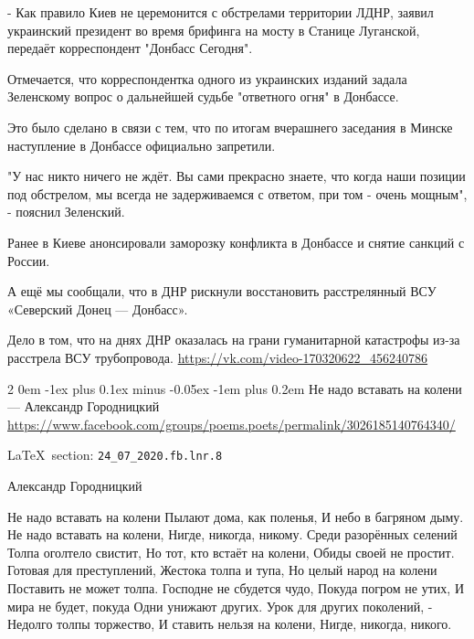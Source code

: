 \documentclass[a4paper,11pt]{extreport}
\makeatletter
\renewcommand\subsection{%
  \clearpage
    \@startsection{subsection}%
    {2}%
    {0em}%
    {-1ex plus 0.1ex minus -0.05ex}%
    {-1em plus 0.2em}%
    {\scshape\bfseries\Large}%
}
\makeatother
\begin{document}

- Как правило Киев не церемонится с обстрелами территории ЛДНР, заявил
украинский президент во время брифинга на мосту в Станице Луганской, передаёт
корреспондент "Донбасс Сегодня".

Отмечается, что корреспондентка одного из украинских изданий задала Зеленскому
вопрос о дальнейшей судьбе "ответного огня" в Донбассе.

Это было сделано в связи с тем, что по итогам вчерашнего заседания в Минске
наступление в Донбассе официально запретили.

"У нас никто ничего не ждёт. Вы сами прекрасно знаете, что когда наши позиции
под обстрелом, мы всегда не задерживаемся с ответом, при том - очень мощным", -
пояснил Зеленский.

Ранее в Киеве анонсировали заморозку конфликта в Донбассе и снятие санкций с
России.

А ещё мы сообщали, что в ДНР рискнули восстановить расстрелянный ВСУ «Северский
Донец --- Донбасс».

Дело в том, что на днях ДНР оказалась на грани гуманитарной катастрофы из-за
расстрела ВСУ трубопровода.  \url{https://vk.com/video-170320622_456240786}
  
 
 
\subsection{Не надо вставать на колени --- Александр Городницкий}
\label{sec:24_07_2020.fb.lnr.8}
\url{https://www.facebook.com/groups/poems.poets/permalink/3026185140764340/}
  
\vspace{0.5cm}
\LaTeX~section: \verb|24_07_2020.fb.lnr.8|
\vspace{0.5cm}

\obeycr
Александр Городницкий

Не надо вставать на колени
Пылают дома, как поленья,
И небо в багряном дыму.
Не надо вставать на колени,
Нигде, никогда, никому.
Среди разорённых селений
Толпа оголтело свистит,
Но тот, кто встаёт на колени,
Обиды своей не простит.
Готовая для преступлений,
Жестока толпа и тупа,
Но целый народ на колени
Поставить не может толпа.
Господне не сбудется чудо,
Покуда погром не утих,
И мира не будет, покуда
Одни унижают других.
Урок для других поколений, -
Недолго толпы торжество,
И ставить нельзя на колени,
Нигде, никогда, никого.
\end{document}
